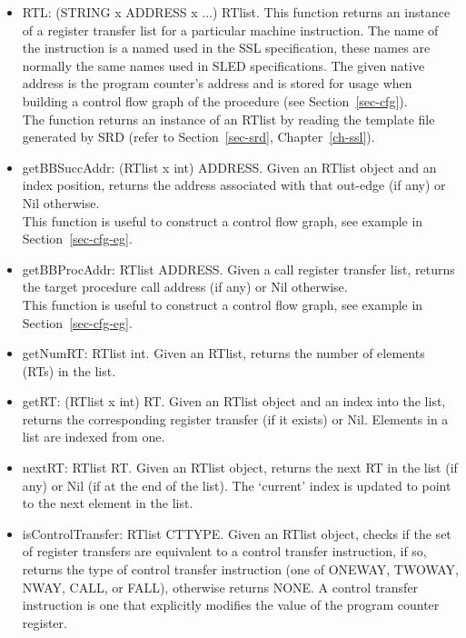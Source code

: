 \begin{itemize}
\item RTL: (STRING x ADDRESS x ...) \ra RTlist.
    This function returns an instance of a register transfer
    list for a particular machine instruction.  The name
    of the instruction is a named used in the SSL specification,
    these names are normally the same names used in SLED
    specifications.   The given native address is the program counter's
    address and is stored for usage when building a control
    flow graph of the procedure (see Section~\ref{sec-cfg}). \\ 
    The function returns an instance of an RTlist by reading
    the template file generated by SRD (refer to Section~\ref{sec-srd},
    Chapter~\ref{ch-ssl}).  \\

\item getBBSuccAddr: (RTlist x int) \ra ADDRESS.
    Given an RTlist object and an index position, returns the 
    address associated with that out-edge (if any) or Nil 
    otherwise.  \\
    This function is useful to construct a control flow graph,
    see example in Section~\ref{sec-cfg-eg}. 

\item getBBProcAddr: RTlist \ra ADDRESS.
    Given a call register transfer list, returns the target procedure 
    call address (if any) or Nil otherwise. \\
    This function is useful to construct a control flow graph,
    see example in Section~\ref{sec-cfg-eg}.

\item getNumRT: RTlist \ra int.
    Given an RTlist, returns the number of elements (RTs) in
    the list.

\item getRT: (RTlist x int) \ra RT.
    Given an RTlist object and an index into the list, returns
    the corresponding register transfer (if it exists) or 
    Nil.
    Elements in a list are indexed from one.

\item nextRT: RTlist \ra RT.
    Given an RTlist object, returns the next RT in the list (if any)
    or Nil (if at the end of the list).  The `current' index is
    updated to point to the next element in the list. 

\item isControlTransfer: RTlist \ra CTTYPE.
    Given an RTlist object, checks if the set of register 
    transfers are equivalent to a control transfer instruction,
    if so, returns the type of control transfer instruction 
    (one of ONEWAY, TWOWAY, NWAY, CALL, or FALL), otherwise
    returns NONE.  
    A control transfer instruction is one that explicitly 
    modifies the value of the program counter register.
\end{itemize}



